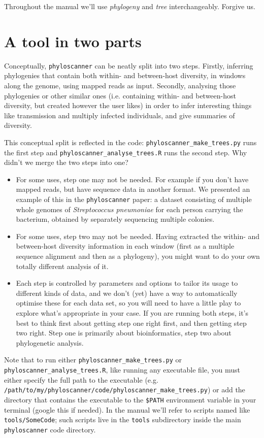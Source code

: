 \documentclass{article}
\newcommand{\p}{\texttt{phyloscanner}\xspace}
\newcommand{\pmt}{\texttt{phyloscanner\_make\_trees.py}\xspace}
\newcommand{\pat}{\texttt{phyloscanner\_analyse\_trees.R}\xspace}
\let\c\texttt
\begin{document}
Throughout the manual we'll use {\it phylogeny} and {\it tree} interchangeably.
Forgive us.

\newpage
\tableofcontents
\newpage

\section*{A tool in two parts}
Conceptually, \p can be neatly split into two steps.
Firstly, inferring phylogenies that contain both within- and between-host diversity, in windows along the genome, using mapped reads as input.
Secondly, analysing those phylogenies or other similar ones (i.e. containing within- and between-host diversity, but created however the user likes) in order to infer interesting things like transmission and multiply infected individuals, and give summaries of diversity.

This conceptual split is reflected in the code: \pmt runs the first step and \pat runs the second step.
Why didn't we merge the two steps into one?
\begin{itemize}
\item For some uses, step one may not be needed.
For example if you don't have mapped reads, but have sequence data in another format.
We presented an example of this in the \p paper: a dataset consisting of multiple whole genomes of {\it Streptococcus pneumoniae} for each person carrying the bacterium, obtained by separately sequencing multiple colonies.
\item For some uses, step two may not be needed.
Having extracted the within- and between-host diversity information in each window (first as a multiple sequence alignment and then as a phylogeny), you might want to do your own totally different analysis of it.
\item Each step is controlled by parameters and options to tailor its usage to different kinds of data, and we don't (yet) have a way to automatically optimise these for each data set, so you will need to have a little play to explore what's appropriate in your case.
If you are running both steps, it's best to think first about getting step one right first, and then getting step two right.
Step one is primarily about bioinformatics, step two about phylogenetic analysis.
\end{itemize}

Note that to run either \pmt or \pat, like running any executable file, you must either specify the full path to the executable (e.g.\\\c{/path/to/my/phyloscanner/code/}\pmt) or add the directory that contains the executable to the \c{\$PATH} environment variable in your terminal (google this if needed).
In the manual we'll refer to scripts named like \c{tools/SomeCode}; such scripts live in the \c{tools} subdirectory inside the main \p code directory.
\end{document}
